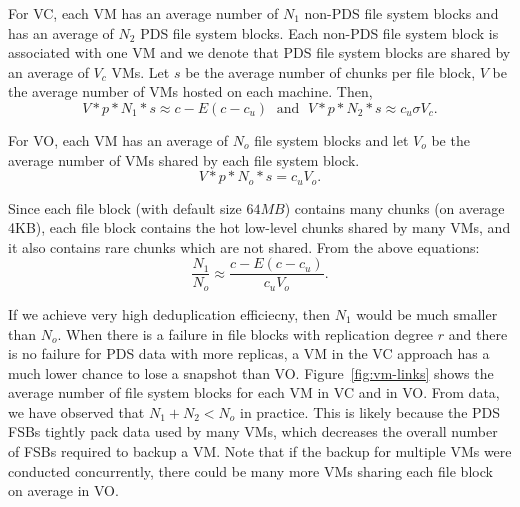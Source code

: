For VC, each VM has an average number of $N_1$ non-PDS file system blocks
and  has  an average of  $N_2$ PDS file system blocks. 
Each non-PDS file system block is associated with one VM
 and  we denote that PDS file system blocks are
shared by an average of $V_c$ VMs. Let $s$ be the average number of chunks per file block, 
$V$ be the average number of VMs hosted on each machine. Then, 
\[
V *p*N_1 *s  \approx c-E(c-c_u)\; \mbox{ and } \; 
V *p*N_2 *s  \approx c_u \sigma V_c.
\]

For VO, each VM has an average of $N_o$ file system blocks
and let $V_o$ be the average number of VMs shared by each file system block.
\[
V *p*N_o *s  = c_u  V_o.
\]

Since each file block (with default size $64MB$) contains many chunks (on average 4KB),
each file block contains the hot low-level chunks shared by many VMs, and it also contains
rare chunks which are not shared.  From the above equations:
\[
\frac{N_1}{N_o} \approx  \frac{c-E(c-c_u)}{c_uV_o}.
\] 

If we achieve very high deduplication efficiecny, then $N_1$ would be much smaller than $N_o$. 
When there is a failure in file blocks with replication degree $r$
and there is no failure for PDS data with more replicas,   a VM in
the VC approach has a much lower chance to lose a snapshot than VO. 
Figure~\ref{fig:vm-links} shows the average number of file system blocks for each VM in VC and in VO. 
From data, we have observed that $N_1 +N_2 < N_o$ in practice. 
This is likely because the PDS FSBs tightly pack data used by many VMs, 
which decreases the overall number of FSBs required to backup a VM.
Note that  if  the backup for multiple VMs were conducted concurrently, there could be many more
VMs sharing each file block on average in VO. 


